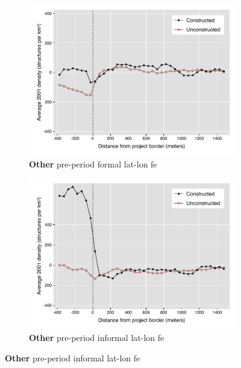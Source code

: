 \documentclass[12pt]{article}
\begin{document}
\begin{figure}
\begin{subfigure}[b]{0.48\textwidth}
        \end{subfigure}
        \begin{subfigure}[b]{0.48\textwidth}
                    \caption[Network2]%
            {{\footnotesize \textbf{Other} pre-period formal lat-lon fe }}   
            \label{fig:prefor}
            \centering
            \includegraphics[width=\textwidth,trim={0.3cm .3cm 0.1cm 0cm}, clip=true]{figures/bblu_for_fe_pre_means_4_3_30k.pdf}

        \end{subfigure}
        \hfill
        \begin{subfigure}[b]{0.48\textwidth}  
                    \caption[]%
            {{\footnotesize \textbf{Other} pre-period informal lat-lon fe }}      
            \label{fig:preinf}
            \centering 
            \includegraphics[width=\textwidth,trim={0.3cm .3cm 0.1cm 0cm}, clip=true]{figures/bblu_inf_fe_pre_means_4_3_30k.pdf}

        \end{subfigure}
\end{figure}
\end{document}
